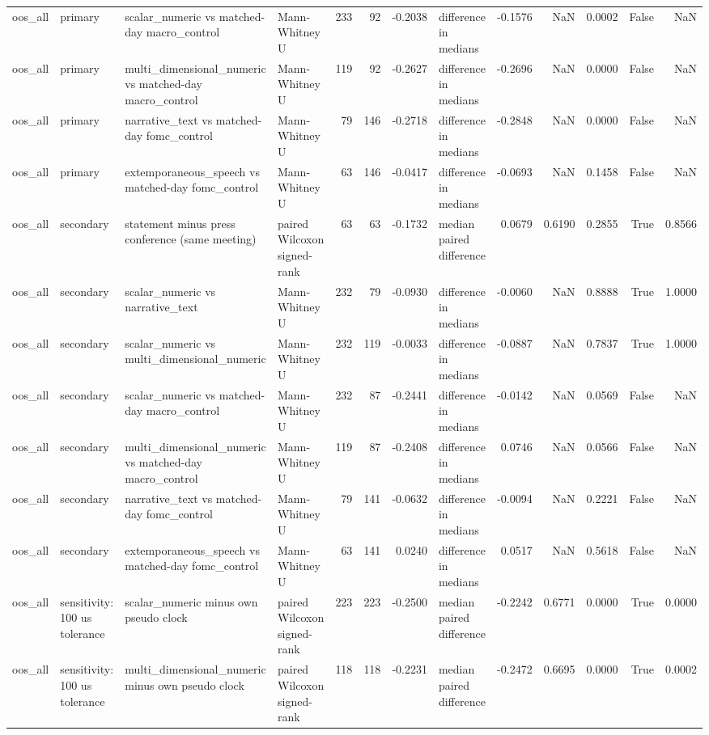 \begin{tabular}{llllrrrlrrrrr}
oos_all & primary & scalar_numeric vs matched-day macro_control & Mann-Whitney U & 233 & 92 & -0.2038 & difference in medians & -0.1576 & NaN & 0.0002 & False & NaN \\
oos_all & primary & multi_dimensional_numeric vs matched-day macro_control & Mann-Whitney U & 119 & 92 & -0.2627 & difference in medians & -0.2696 & NaN & 0.0000 & False & NaN \\
oos_all & primary & narrative_text vs matched-day fomc_control & Mann-Whitney U & 79 & 146 & -0.2718 & difference in medians & -0.2848 & NaN & 0.0000 & False & NaN \\
oos_all & primary & extemporaneous_speech vs matched-day fomc_control & Mann-Whitney U & 63 & 146 & -0.0417 & difference in medians & -0.0693 & NaN & 0.1458 & False & NaN \\
oos_all & secondary & statement minus press conference (same meeting) & paired Wilcoxon signed-rank & 63 & 63 & -0.1732 & median paired difference & 0.0679 & 0.6190 & 0.2855 & True & 0.8566 \\
oos_all & secondary & scalar_numeric vs narrative_text & Mann-Whitney U & 232 & 79 & -0.0930 & difference in medians & -0.0060 & NaN & 0.8888 & True & 1.0000 \\
oos_all & secondary & scalar_numeric vs multi_dimensional_numeric & Mann-Whitney U & 232 & 119 & -0.0033 & difference in medians & -0.0887 & NaN & 0.7837 & True & 1.0000 \\
oos_all & secondary & scalar_numeric vs matched-day macro_control & Mann-Whitney U & 232 & 87 & -0.2441 & difference in medians & -0.0142 & NaN & 0.0569 & False & NaN \\
oos_all & secondary & multi_dimensional_numeric vs matched-day macro_control & Mann-Whitney U & 119 & 87 & -0.2408 & difference in medians & 0.0746 & NaN & 0.0566 & False & NaN \\
oos_all & secondary & narrative_text vs matched-day fomc_control & Mann-Whitney U & 79 & 141 & -0.0632 & difference in medians & -0.0094 & NaN & 0.2221 & False & NaN \\
oos_all & secondary & extemporaneous_speech vs matched-day fomc_control & Mann-Whitney U & 63 & 141 & 0.0240 & difference in medians & 0.0517 & NaN & 0.5618 & False & NaN \\
oos_all & sensitivity: 100 us tolerance & scalar_numeric minus own pseudo clock & paired Wilcoxon signed-rank & 223 & 223 & -0.2500 & median paired difference & -0.2242 & 0.6771 & 0.0000 & True & 0.0000 \\
oos_all & sensitivity: 100 us tolerance & multi_dimensional_numeric minus own pseudo clock & paired Wilcoxon signed-rank & 118 & 118 & -0.2231 & median paired difference & -0.2472 & 0.6695 & 0.0000 & True & 0.0002 \\

\end{tabular}

